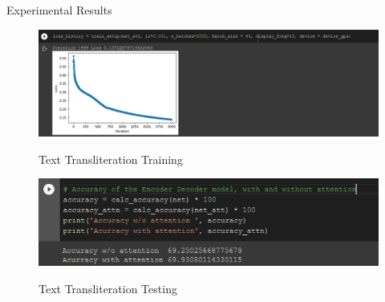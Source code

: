 \documentclass{beamer}
\begin{document}
\begin{frame}[allowframebreaks]{Experimental Results}
	\begin{figure}
				{\includegraphics[scale=.3]{Transliteration_Training_Result}}
				\caption{Text Transliteration Training}
				\label{Transliteration_Training_Result}
	\end{figure}
	\begin{figure}
				{\includegraphics[scale=.3]{Transliteration_Testing_Result}}
				\caption{Text Transliteration Testing}
				\label{Transliteration_Testing_Result}
	\end{figure}
	\begin{figure}
           \begin{subfigure}[b]{0.3\linewidth}

\end{subfigure}
\end{figure}
\end{frame}
\end{document}
